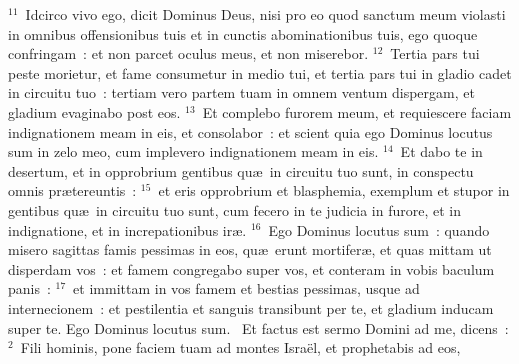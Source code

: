 ${}^{11}$~Idcirco vivo ego, dicit Dominus Deus, nisi pro eo quod sanctum meum violasti in omnibus offensionibus tuis et in cunctis abominationibus tuis, ego quoque confringam~: et non parcet oculus meus, et non miserebor.
${}^{12}$~Tertia pars tui peste morietur, et fame consumetur in medio tui, et tertia pars tui in gladio cadet in circuitu tuo~: tertiam vero partem tuam in omnem ventum dispergam, et gladium evaginabo post eos.
${}^{13}$~Et complebo furorem meum, et requiescere faciam indignationem meam in eis, et consolabor~: et scient quia ego Dominus locutus sum in zelo meo, cum implevero indignationem meam in eis.
${}^{14}$~Et dabo te in desertum, et in opprobrium gentibus qu\ae\ in circuitu tuo sunt, in conspectu omnis pr\ae tereuntis~:
${}^{15}$~et eris opprobrium et blasphemia, exemplum et stupor in gentibus qu\ae\ in circuitu tuo sunt, cum fecero in te judicia in furore, et in indignatione, et in increpationibus ir\ae .
${}^{16}$~Ego Dominus locutus sum~: quando misero sagittas famis pessimas in eos, qu\ae\ erunt mortifer\ae , et quas mittam ut disperdam vos~: et famem congregabo super vos, et conteram in vobis baculum panis~:
${}^{17}$~et immittam in vos famem et bestias pessimas, usque ad internecionem~: et pestilentia et sanguis transibunt per te, et gladium inducam super te. Ego Dominus locutus sum.
~Et factus est sermo Domini ad me, dicens~:
${}^{2}$~Fili hominis, pone faciem tuam ad montes Isra\"el, et prophetabis ad eos,
